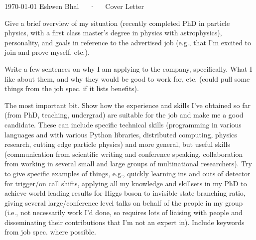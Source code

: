 \documentclass[12pt, a4paper]{awesome-cv}
\begin{document}
\makecvheader[C]

 \makecvfooter
   {\today}
   {Eshwen Bhal~~~·~~~Cover Letter}
   {\thepage}

\makelettertitle

\begin{cvletter}

Give a brief overview of my situation (recently completed PhD in particle physics, with a first class master’s degree in physics with astrophysics), personality, and goals in reference to the advertised job (e.g., that I'm excited to join and prove myself, etc.).

Write a few sentences on why I am applying to the company, specifically.
What I like about them, and why they would be good to work for, etc. (could pull some things from the job spec. if it lists benefits).
    
The most important bit.
Show how the experience and skills I've obtained so far (from PhD, teaching, undergrad) are suitable for the job and make me a good candidate.
These can include specific technical skills (programming in various languages and with various Python libraries, distributed computing, physics research, cutting edge particle physics) and more general, but useful skills (communication from scientific writing and conference speaking, collaboration from working in several small and large groups of multinational researchers).
Try to give specific examples of things, e.g., quickly learning ins and outs of detector for trigger/on call shifts, applying all my knowledge and skillsets in my PhD to achieve world leading results for Higgs boson to invisible state branching ratio, giving several large/conference level talks on behalf of the people in my group (i.e., not necessarily work I'd done, so requires lots of liaising with people and disseminating their contributions that I'm not an expert in).
Include keywords from job spec. where possible.
    
\end{cvletter}
    
\makeletterclosing
    
\end{document}

